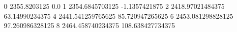 0 2355.8203125 0.0
1 2354.6845703125 -1.1357421875
2 2418.97021484375 63.14990234375
4 2441.541259765625 85.720947265625
6 2453.081298828125 97.260986328125
8 2464.458740234375 108.638427734375
